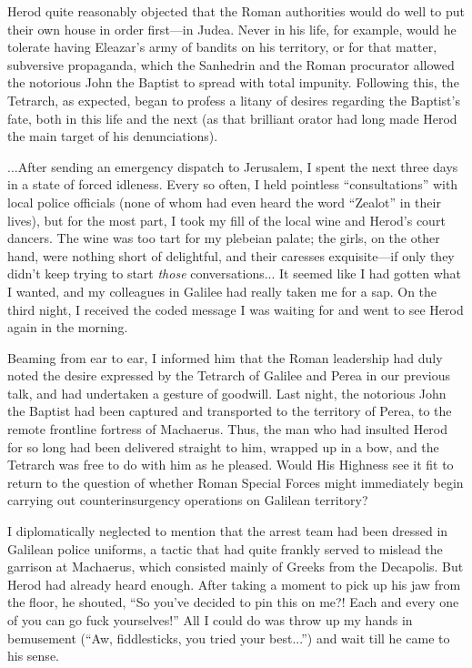 Herod quite reasonably objected that the Roman authorities would do well to put their own house in order first---in Judea. Never in his life, for example, would he tolerate having Eleazar's army of bandits on his territory, or for that matter, subversive propaganda, which the Sanhedrin and the Roman procurator allowed the notorious John the Baptist to spread with total impunity. Following this, the Tetrarch, as expected, began to profess a litany of desires regarding the Baptist's fate, both in this life and the next (as that brilliant orator had long made Herod the main target of his denunciations).

...After sending an emergency dispatch to Jerusalem, I spent the next three days in a state of forced idleness. Every so often, I held pointless ``consultations'' with local police officials (none of whom had even heard the word ``Zealot'' in their lives), but for the most part, I took my fill of the local wine and Herod's court dancers. The wine was too tart for my plebeian palate; the girls, on the other hand, were nothing short of delightful, and their caresses exquisite---if only they didn't keep trying to start \emph{those} conversations... It seemed like I had gotten what I wanted, and my colleagues in Galilee had really taken me for a sap. On the third night, I received the coded message I was waiting for and went to see Herod again in the morning.

Beaming from ear to ear, I informed him that the Roman leadership had duly noted the desire expressed by the Tetrarch of Galilee and Perea in our previous talk, and had undertaken a gesture of goodwill. Last night, the notorious John the Baptist had been captured and transported to the territory of Perea, to the remote frontline fortress of Machaerus. Thus, the man who had insulted Herod for so long had been delivered straight to him, wrapped up in a bow, and the Tetrarch was free to do with him as he pleased. Would His Highness see it fit to return to the question of whether Roman Special Forces might immediately begin carrying out counterinsurgency operations on Galilean territory?

I diplomatically neglected to mention that the arrest team had been dressed in Galilean police uniforms, a tactic that had quite frankly served to mislead the garrison at Machaerus, which consisted mainly of Greeks from the Decapolis. But Herod had already heard enough. After taking a moment to pick up his jaw from the floor, he shouted, ``So you've decided to pin this on me?! Each and every one of you can go fuck yourselves!'' All I could do was throw up my hands in bemusement (``Aw, fiddlesticks, you tried your best...'') and wait till he came to his sense.

